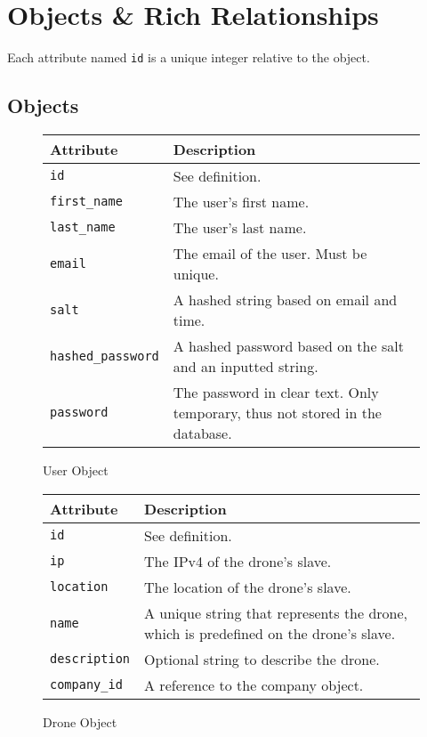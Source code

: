 \chapter{Objects \& Rich Relationships}

Each attribute named \verb+id+ is a unique integer relative to the object.

\section{Objects}
\begin{figure}[htb]
\begin{center}
\begin{tabular}{ | l | p{8cm} | }
  \hline
    \textbf{Attribute} & \textbf{Description} \\ \hline
    \verb+id+ & See definition.\\ \hline
    \verb+first_name+ & The user's first name.\\ \hline
    \verb+last_name+ & The user's last name.\\ \hline
    \verb+email+ & The email of the user. Must be unique.\\ \hline
    \verb+salt+ & A hashed string based on email and time.\\ \hline
    \verb+hashed_password+ & A hashed password based on the salt and an inputted string.\\ \hline
    \verb+password+ & The password in clear text. Only temporary, thus not stored in the database.\\ \hline
\end{tabular}
\caption{User Object}
\label{tab:user_object}
\end{center}
\end{figure}

\begin{figure}[htb]
\begin{center}
\begin{tabular}{ | l | p{8cm} | }
  \hline
    \textbf{Attribute} & \textbf{Description} \\ \hline
    \verb+id+ & See definition.\\ \hline
    \verb+ip+ & The IPv4 of the drone's slave.\\ \hline
    \verb+location+ & The location of the drone's slave.\\ \hline
    \verb+name+ & A unique string that represents the drone, which is predefined on the drone's slave.\\ \hline
    \verb+description+ & Optional string to describe the drone.\\ \hline
    \verb+company_id+ & A reference to the company object.\\ \hline
\end{tabular}
\caption{Drone Object}
\label{tab:drone_object}
\end{center}
\end{figure}

